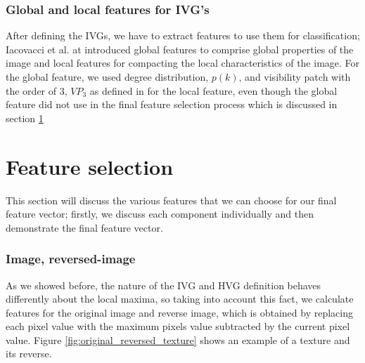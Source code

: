 \documentclass[conference]{IEEEtran}
\begin{document}
\subsubsection{\textbf{Global and local features for IVG's}}
After defining the IVGs, we have to extract features to use them for classification; Iacovacci et al. at \cite{IVG} introduced global features to comprise global properties of the image and local features for compacting the local characteristics of the image. For the global feature, we used degree distribution, $p(k)$, and visibility patch with the order of 3, $VP_3$ as defined in \cite{IVG} for the local feature, even though the global feature did not use in the final feature selection process which is discussed in section \ref{feature_selecting}



\section{\large{Feature selection}}\label{feature_selecting}
This section will discuss the various features that we can choose for our final feature vector; firstly, we discuss each component individually and then demonstrate the final feature vector.


\subsubsection{\textbf{Image, reversed-image}}
As we showed before, the nature of the IVG and HVG definition behaves differently about the local maxima, so taking into account this fact, we calculate features for the original image and reverse image, which is obtained by replacing each pixel value with the maximum pixels value subtracted by the current pixel value.
Figure \ref{fig:original_reversed_texture} shows an example of a texture and its reverse.
\end{document}
